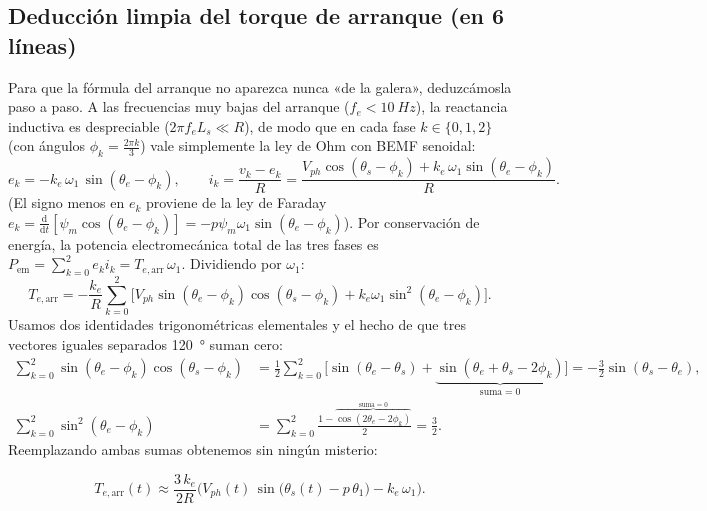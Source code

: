 \documentclass[11pt,a4paper,oneside]{book}
\newcommand{\dd}{\mathrm{d}}
\begin{document}
\subsection{Deducción limpia del torque de arranque (en 6 líneas)}
Para que la fórmula del arranque no aparezca nunca «de la galera», deduzcámosla
paso a paso. A las frecuencias muy bajas del arranque ($f_e < \SI{10}{Hz}$), la
reactancia inductiva es despreciable ($2\pi f_e L_s \ll R$), de modo que en cada
fase $k \in \{0,1,2\}$ (con ángulos $\phi_k = \frac{2\pi k}{3}$) vale simplemente
la ley de Ohm con BEMF senoidal:
\[
  e_k = -k_e\,\omega_1\,\sin(\theta_e - \phi_k),
  \qquad
  i_k = \frac{v_k - e_k}{R}
      = \frac{V_{ph}\cos(\theta_s - \phi_k) + k_e\,\omega_1\sin(\theta_e - \phi_k)}{R}.
\]
(El signo menos en $e_k$ proviene de la ley de Faraday $e_k = \frac{\dd}{\dd t}[\psi_m\cos(\theta_e - \phi_k)] = -p\psi_m\omega_1\sin(\theta_e-\phi_k)$).
Por conservación de energía, la potencia electromecánica total de las tres fases
es $P_{\text{em}} = \sum_{k=0}^2 e_k i_k = T_{e,\text{arr}}\,\omega_1$.
Dividiendo por $\omega_1$:
\[
  T_{e,\text{arr}}
  = -\frac{k_e}{R}\sum_{k=0}^{2}
    \Big[V_{ph}\sin(\theta_e - \phi_k)\cos(\theta_s - \phi_k)
       + k_e\omega_1\sin^2(\theta_e - \phi_k)\Big].
\]
Usamos dos identidades trigonométricas elementales y el hecho de que tres
vectores iguales separados \SI{120}{\degree} suman cero:
\begin{align*}
  \sum_{k=0}^2 \sin(\theta_e-\phi_k)\cos(\theta_s-\phi_k)
  &= \frac{1}{2}\sum_{k=0}^2\Big[\sin(\theta_e-\theta_s) + \underbrace{\sin(\theta_e+\theta_s-2\phi_k)}_{\text{suma}=0}\Big]
   = -\frac{3}{2}\sin(\theta_s - \theta_e), \\
  \sum_{k=0}^2 \sin^2(\theta_e-\phi_k)
  &= \sum_{k=0}^2 \frac{1 - \overbrace{\cos(2\theta_e - 2\phi_k)}^{\text{suma}=0}}{2}
   = \frac{3}{2}.
\end{align*}
Reemplazando ambas sumas obtenemos sin ningún misterio:
\begin{ecuacionclave}
\begin{equation}
  T_{e,\text{arr}}(t) \approx \frac{3\,k_e}{2R}
  \Big(V_{ph}(t)\,\sin\!\big(\theta_s(t) - p\,\theta_1\big) - k_e\,\omega_1\Big).
  \label{eq:torque_arranque_deducido}
\end{equation}
\end{ecuacionclave}
\end{document}
